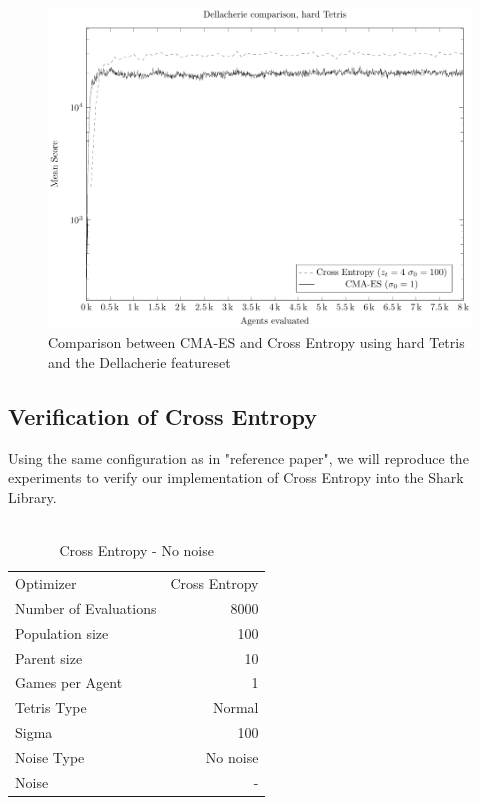 \begin{figure}[H]
\includegraphics[scale=1]{plots/plotDellCmaVsCEHardTetris}
\caption{Comparison between CMA-ES and Cross Entropy 
using hard Tetris and the Dellacherie featureset}
\end{figure}

\clearpage

\subsection{Verification of Cross Entropy}
Using the same configuration as in "reference paper", we will reproduce the experiments to verify our implementation of Cross Entropy into the Shark Library.\\
\\
\begin{table}[h!]
\centering
\begin{tabular}{l r}
Optimizer & Cross Entropy\\
Number of Evaluations & 8000\\
Population size & 100\\
Parent size & 10\\
Games per Agent & 1\\
Tetris Type & Normal\\
\hline
Sigma & 100\\
Noise Type & No noise\\
Noise & -
\end{tabular}
\caption{Cross Entropy - No noise}
\end{table}

